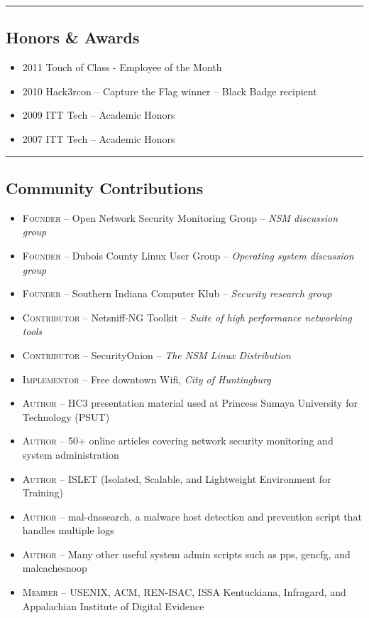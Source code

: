 \documentclass[10pt,letterpaper]{article}
\begin{document}
\hrule
\vspace{-0.4em}
\subsection*{Honors \& Awards}

\begin{itemize}
	\parskip=0.1em

	\item \textsc{2011} Touch of Class - Employee of the Month
	\item \textsc{2010} Hack3rcon – Capture the Flag winner – Black Badge recipient
	\item \textsc{2009} ITT Tech – Academic Honors
	\item \textsc{2007} ITT Tech – Academic Honors

\end{itemize}

\hrule
\vspace{-0.4em}
\subsection*{Community Contributions}

\begin{itemize}
	\parskip=0.1em

	\item \textsc{Founder} -- Open Network Security Monitoring Group – \textit{NSM discussion group}
	\item \textsc{Founder} -- Dubois County Linux User Group – \textit{Operating system discussion group}
	\item \textsc{Founder} -- Southern Indiana Computer Klub – \textit{Security research group}
	\item \textsc{Contributor} -- Netsniff-NG Toolkit – \textit{Suite of high performance networking tools}
	\item \textsc{Contributor} -- SecurityOnion – \textit{The NSM Linux Distribution}
	\item \textsc{Implementor} -- Free downtown Wifi, \textit{City of Huntingburg}
	\item \textsc{Author} -- HC3 presentation material used at Princess Sumaya University for Technology (PSUT)
	\item \textsc{Author} -- 50+ online articles covering network security monitoring and system administration
	\item \textsc{Author} -- ISLET (Isolated, Scalable, and Lightweight Environment for Training)
	\item \textsc{Author} -- mal-dnssearch, a malware host detection and prevention script that handles multiple logs
	\item \textsc{Author} -- Many other useful system admin scripts such as pps, gencfg, and malcachesnoop
	\item \textsc{Member} -- USENIX, ACM, REN-ISAC, ISSA Kentuckiana, Infragard, and Appalachian Institute of Digital Evidence

\end{itemize}
\end{document}
